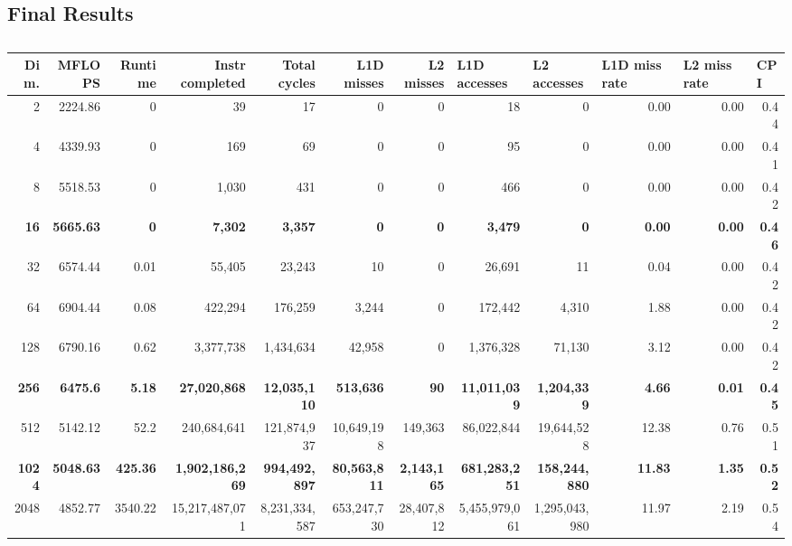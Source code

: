 \documentclass{article}
\begin{document}
\subsection{Final Results}
\begin{table}[htbp]
\caption{}
\begin{tabular}{|r|r|r|r|r|r|r|r|r|r|r|r|}
\hline
Dim. &   MFLOPS &     Runtime & Instr completed & Total cycles & L1D misses & L2 misses & \multicolumn{1}{l|}{L1D accesses} & \multicolumn{1}{l|}{ L2 accesses} & \multicolumn{1}{l|}{L1D miss rate} & \multicolumn{1}{l|}{L2 miss rate} & \multicolumn{1}{l|}{CPI} \\ \hline
2 & 2224.86 & 0 & 39 & 17 & 0 & 0 & 18 & 0 & 0.00 & 0.00 & 0.44 \\ \hline
4 & 4339.93 & 0 & 169 & 69 & 0 & 0 & 95 & 0 & 0.00 & 0.00 & 0.41 \\ \hline
8 & 5518.53 & 0 & 1,030 & 431 & 0 & 0 & 466 & 0 & 0.00 & 0.00 & 0.42 \\ \hline
\textbf{16} & \textbf{5665.63} & \textbf{0} & \textbf{7,302} & \textbf{3,357} & \textbf{0} & \textbf{0} & \textbf{3,479} & \textbf{0} & \textbf{0.00} & \textbf{0.00} & \textbf{0.46} \\ \hline
32 & 6574.44 & 0.01 & 55,405 & 23,243 & 10 & 0 & 26,691 & 11 & 0.04 & 0.00 & 0.42 \\ \hline
64 & 6904.44 & 0.08 & 422,294 & 176,259 & 3,244 & 0 & 172,442 & 4,310 & 1.88 & 0.00 & 0.42 \\ \hline
128 & 6790.16 & 0.62 & 3,377,738 & 1,434,634 & 42,958 & 0 & 1,376,328 & 71,130 & 3.12 & 0.00 & 0.42 \\ \hline
\textbf{256} & \textbf{6475.6} & \textbf{5.18} & \textbf{27,020,868} & \textbf{12,035,110} & \textbf{513,636} & \textbf{90} & \textbf{11,011,039} & \textbf{1,204,339} & \textbf{4.66} & \textbf{0.01} & \textbf{0.45} \\ \hline
512 & 5142.12 & 52.2 & 240,684,641 & 121,874,937 & 10,649,198 & 149,363 & 86,022,844 & 19,644,528 & 12.38 & 0.76 & 0.51 \\ \hline
\textbf{1024} & \textbf{5048.63} & \textbf{425.36} & \textbf{1,902,186,269} & \textbf{994,492,897} & \textbf{80,563,811} & \textbf{2,143,165} & \textbf{681,283,251} & \textbf{158,244,880} & \textbf{11.83} & \textbf{1.35} & \textbf{0.52} \\ \hline
2048 & 4852.77 & 3540.22 & 15,217,487,071 & 8,231,334,587 & 653,247,730 & 28,407,812 & 5,455,979,061 & 1,295,043,980 & 11.97 & 2.19 & 0.54 \\ \hline
\end{tabular}
\label{}
\end{table}
\end{document}
